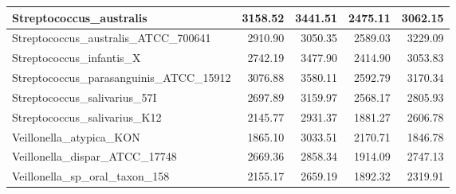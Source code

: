 \documentclass[12pt,a4paper]{article}
\begin{document}
\begin{table}[ht]
\begin{center}
\begin{tabular}{|l*{4}{|r}|}
Streptococcus\_australis & 3158.52 & 3441.51 & 2475.11 & 3062.15 \\ \hline
Streptococcus\_australis\_ATCC\_700641 & 2910.90 & 3050.35 & 2589.03 & 3229.09 \\ \hline
Streptococcus\_infantis\_X & 2742.19 & 3477.90 & 2414.90 & 3053.83 \\ \hline
Streptococcus\_parasanguinis\_ATCC\_15912 & 3076.88 & 3580.11 & 2592.79 & 3170.34 \\ \hline
Streptococcus\_salivarius\_57I & 2697.89 & 3159.97 & 2568.17 & 2805.93 \\ \hline
Streptococcus\_salivarius\_K12 & 2145.77 & 2931.37 & 1881.27 & 2606.78 \\ \hline
Veillonella\_atypica\_KON & 1865.10 & 3033.51 & 2170.71 & 1846.78 \\ \hline
Veillonella\_dispar\_ATCC\_17748 & 2669.36 & 2858.34 & 1914.09 & 2747.13 \\ \hline
Veillonella\_sp\_oral\_taxon\_158 & 2155.17 & 2659.19 & 1892.32 & 2319.91 \\ \hline
\end{tabular}
\end{center}
\end{table}
\end{document}
